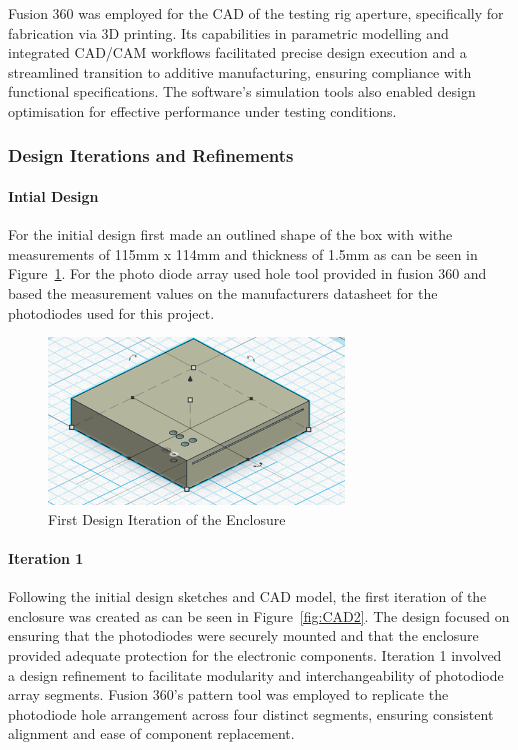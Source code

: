 Fusion 360 was employed for the CAD of the testing rig aperture, specifically for fabrication via 3D printing. 
Its capabilities in parametric modelling and integrated CAD/CAM workflows facilitated precise design execution and a streamlined transition to additive manufacturing, ensuring compliance with functional specifications. 
The software's simulation tools also enabled design optimisation for effective performance under testing conditions.

\subsubsection{Design Iterations and Refinements}
\paragraph{Intial Design}

For the initial design first made an outlined shape of the box with withe measurements of 115mm x 114mm and thickness of 1.5mm as can be seen in Figure~\ref{fig:CAD1}.
For the photo diode array used hole tool provided in fusion 360 and based the measurement values on the manufacturers datasheet for the photodiodes used for this project.



\begin{figure}[htbp]
    \centering
    \includegraphics[width=0.7\textwidth]{figures/CAD-3DPrint/FirstIteration.png}
    \caption{First Design Iteration of the Enclosure}
    \label{fig:CAD1}
\end{figure}


\paragraph{Iteration 1}

Following the initial design sketches and CAD model, the first iteration of the enclosure was created as can be seen in Figure~\ref{fig:CAD2}.
The design focused on ensuring that the photodiodes were securely mounted and that the enclosure provided adequate protection for the electronic components. 
Iteration 1 involved a design refinement to facilitate modularity and interchangeability of photodiode array segments. 
Fusion 360's pattern tool was employed to replicate the photodiode hole arrangement across four distinct segments, ensuring consistent alignment and ease of component replacement.

